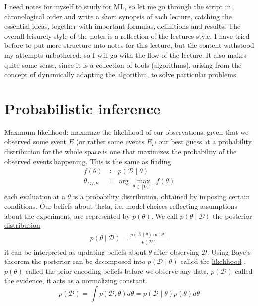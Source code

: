 \documentclass[12 pt]{article}        	%
\begin{document}
    
I need notes for myself to study for ML, so let me go through the script in chronological order and write a short synopsis of each lecture, catching the essential ideas, together with important formulas, definitions and results.
The overall leisurely style of the notes is a reflection of the lectures style. 
I have tried before to put more structure into notes for this lecture, but the content withstood my attempts unbothered, so I will go with the
flow of the lecture.
It also makes quite some sense, since it is a collection of tools (algorithms), arising from the concept of dynamically adapting the algorithm, to solve particular problems.

\section{Probabilistic inference}
Maximum likelihood: maximize the likelihood of our observations.
given that we observed some event $ E $ (or rather some events $ E_i $) our best guess
at a probability distribution for the whole space is one that maximizes the probability 
of the observed events happening.
This is the same as finding 
\begin{align*}
    f ( \theta ) &\coloneqq p ( \mathcal{ D } \mid \theta )
    \\
    \theta_{ MLE } &= \arg \max_{ \theta \in [ 0 , 1 ] } f ( \theta )
\end{align*}
each evaluation at a $ \theta $ is a probability distribution, obtained by imposing certain conditions.
Our beliefs about theta, i.e. model choices reflecting assumptions about the experiment, 
are represented by $ p ( \theta ) $.
We call $ p ( \theta \mid \mathcal{ D } ) $ the \underline{posterior distribution}
\begin{align*}
    p ( \theta \mid \mathcal{ D } ) = \frac{ p ( \mathcal{ D } \mid \theta ) \cdot p ( \theta ) }{ p ( \mathcal{ D } ) }
\end{align*}
it can be interpreted as updating beliefs about $ \theta $ after observing $ \mathcal{ D } $.
Using Baye's theorem the posterior can be decomposed into $ p ( \mathcal{ D } \mid \theta ) $ called the \underline{likelihood} , $ p( \theta ) $ called the prior encoding beliefs before we observe any data, $ p ( \mathcal{ D } ) $ called the evidence, it acts as a normalizing constant.
\[
    p ( \mathcal{ D } ) = \int p ( \mathcal{ D , \theta } ) d \theta  = p ( \mathcal{ D } \mid \theta ) p( \theta ) d \theta 
\]
\end{document}
